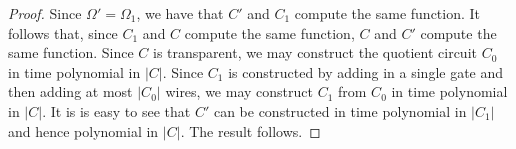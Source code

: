 \documentclass[../paper.tex]{subfiles}
\begin{document}
\begin{proof}
  Since $\Omega' = \Omega_1$, we have that $C'$ and $C_1$ compute the same
  function. It follows that, since $C_1$ and $C$ compute the same function, $C$
  and $C'$ compute the same function. Since $C$ is transparent, we may construct
  the quotient circuit $C_0$ in time polynomial in $\vert C \vert$. Since $C_1$
  is constructed by adding in a single gate and then adding at most $\vert C_0
  \vert$ wires, we may construct $C_1$ from $C_0$ in time polynomial in $\vert C
  \vert$. It is is easy to see that $C'$ can be constructed in time polynomial
  in $\vert C_1 \vert$ and hence polynomial in $\vert C \vert$. The result
  follows.



\end{proof}
\end{document}
